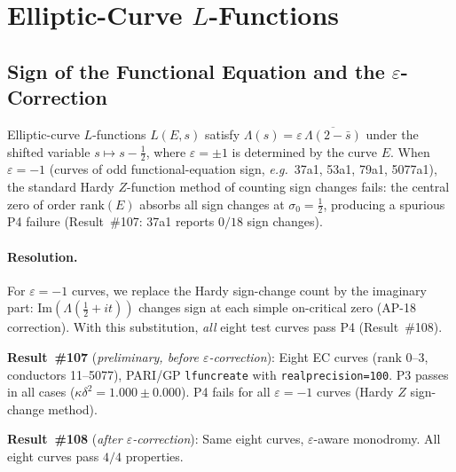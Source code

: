 \documentclass[11pt, a4paper]{article}
\theoremstyle{plain}
\theoremstyle{definition}
\newcommand{\eg}{\textit{e.g.}}
\begin{document}
\section{Elliptic-Curve $L$-Functions}
\label{sec:ec}

\subsection{Sign of the Functional Equation and the $\varepsilon$-Correction}
\label{ssec:epsilon}

Elliptic-curve $L$-functions $L(E,s)$ satisfy $\Lambda(s) = \varepsilon\,
\overline{\Lambda(2-\bar{s})}$ under the shifted variable $s\mapsto s-\tfrac{1}{2}$,
where $\varepsilon=\pm 1$ is determined by the curve $E$.
When $\varepsilon=-1$ (curves of odd functional-equation sign, \eg\
37a1, 53a1, 79a1, 5077a1), the standard Hardy $Z$-function method of
counting sign changes fails: the central zero of order $\text{rank}(E)$
absorbs all sign changes at $\sigma_{0}=\tfrac{1}{2}$, producing a
spurious P4 failure (Result~\#107: 37a1 reports $0/18$ sign changes).

\paragraph{Resolution.}
For $\varepsilon=-1$ curves, we replace the Hardy sign-change count
by the imaginary part: $\mathrm{Im}(\Lambda(\tfrac{1}{2}+it))$ changes
sign at each simple on-critical zero (AP-18 correction).  With this
substitution, \textit{all} eight test curves pass P4 (Result~\#108).

\medskip
\noindent
\textbf{Result~\#107} (\textit{preliminary, before $\varepsilon$-correction}):
Eight EC curves (rank 0--3, conductors 11--5077), PARI/GP \texttt{lfuncreate}
with \texttt{realprecision=100}.  P3 passes in all cases
($\kappa\delta^{2}=1.000\pm0.000$).  P4 fails for all $\varepsilon=-1$
curves (Hardy $Z$ sign-change method).

\medskip
\noindent
\textbf{Result~\#108} (\textit{after $\varepsilon$-correction}):
Same eight curves, $\varepsilon$-aware monodromy.  All eight curves pass
$4/4$ properties.
\end{document}
